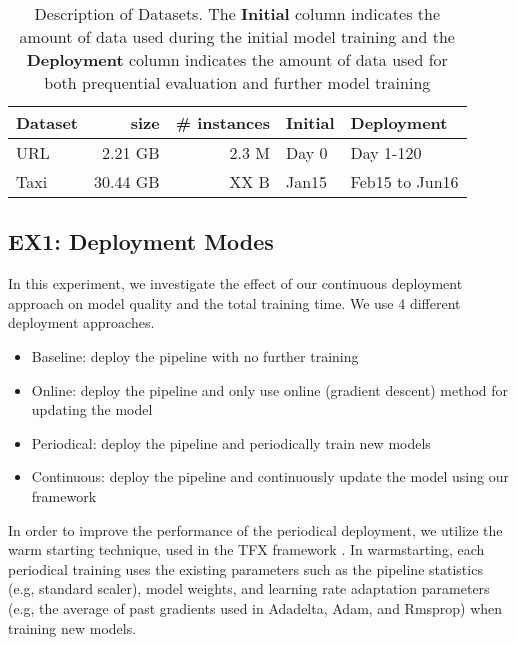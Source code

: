 \begin{table}[h!]
\centering
\begin{tabular}{lrrll}
\hline
\textbf{Dataset}  & \textbf{size} &\textbf{\# instances} & \textbf{Initial} & \textbf{Deployment} \\
\hline
URL        &  2.21 GB & 2.3 M           & Day 0        & Day 1-120          \\
Taxi        & 30.44 GB & XX B              & Jan15             & Feb15 to Jun16    \\
\hline
\end{tabular}
\caption{Description of Datasets. The \textbf{Initial} column indicates the amount of data used during the initial model training and the \textbf{Deployment} column indicates the amount of data used for both prequential evaluation and further model training}  
\label{dataset-description}
\end{table}


\subsection{EX1: Deployment Modes}
In this experiment, we investigate the effect of our continuous deployment approach on model quality and the total training time.
We use 4 different deployment approaches.
\begin{itemize}
\item Baseline: deploy the pipeline with no further training
\item Online: deploy the pipeline and only use online (gradient descent) method for updating the model
\item Periodical: deploy the pipeline and periodically train new models 
\item Continuous: deploy the pipeline and continuously update the model using our framework
\end{itemize}

In order to improve the performance of the periodical deployment, we utilize the warm starting technique, used in the TFX framework \cite{baylor2017tfx}.
In warmstarting, each periodical training uses the existing parameters such as the pipeline statistics (e.g, standard scaler), model weights, and learning rate adaptation parameters (e.g, the average of past gradients used in Adadelta, Adam, and Rmsprop) when training new models.

